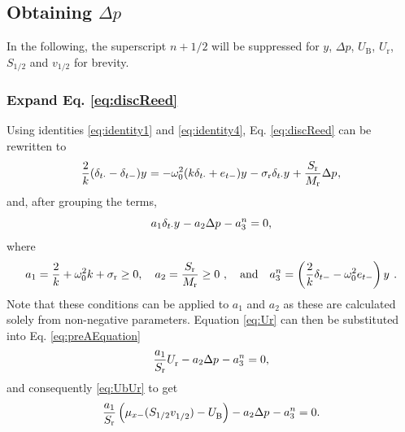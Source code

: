 \subsection{Obtaining $\Delta p$}\label{sec:obtainingDeltaP}
In the following, the superscript $n+1/2$ will be suppressed for $y$, $\Delta p$, $U_\text{B}$, $U_\text{r}$, $S_{1/2}$ and $v_{1/2}$ for brevity. 

\subsubsection{Expand Eq. \eqref{eq:discReed}}
Using identities \eqref{eq:identity1} and \eqref{eq:identity4}, Eq. \eqref{eq:discReed} can be rewritten to
\begin{equation*}
    \frac{2}{k} (\delta_{t\cdot} - \delta_{t-})y^{} = -\omega_0^2(k\delta_{t\cdot} + e_{t-})y^{} - \sigma_\text{r}\delta_{t\cdot} y^{} + \frac{S_\text{r}}{M_\text{r}}\Delta p^{},
\end{equation*}
and, after grouping the terms,
\begin{equation}
    a_1\delta_{t\cdot}y^{} - a_2\Delta p^{} - a_3^n = 0,\label{eq:preAEquation}
\end{equation}
where
\begin{equation}\label{eq:aCoeffs}
    a_1 = \frac{2}{k} + \omega_0^2k + \sigma_\text{r} \geq 0, \quad a_2 = \frac{S_\text{r}}{M_\text{r}} \geq 0\ , \quad \text{and} \quad a_3^n = \left(\frac{2}{k} \delta_{t-} - \omega_0^2e_{t-}\right)y^{\nph}\ .
\end{equation}
Note that these conditions can be applied to $a_1$ and $a_2$ as these are calculated solely from non-negative parameters. %
Equation \eqref{eq:Ur} can then be substituted into Eq. \eqref{eq:preAEquation}
\begin{equation*}
    \frac{a_1}{S_\text{r}}U_\text{r}^{} - a_2 \Delta p^{} - a_3^n = 0,
\end{equation*}
and consequently \eqref{eq:UbUr} to get
\begin{equation}\label{eq:aEquation}
    \frac{a_1}{S_\text{r}}\left(\mu_{x-}(S_{1/2}v_{1/2}^{}) - U_\text{B}^{}\right) - a_2 \Delta p^{} - a_3^n = 0.
\end{equation}
%
